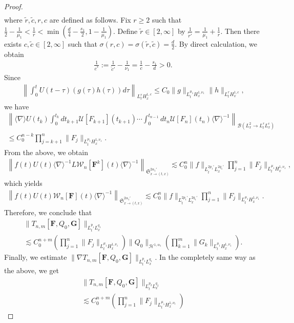 \documentclass[10pt]{amsart}
\newcommand{\No}[1]{}
\theoremstyle{definition}
\numberwithin{equation}{section}
\newcommand{\vF}{{\mathbf{F}}}
\newcommand{\vG}{{\mathbf{G}}}
\newcommand{\CB}{\mathcal{B}}
\newcommand{\CH}{\mathcal{H}}
\newcommand{\CU}{\mathcal{U}}
\newcommand{\CW}{\mathcal{W}}
\newcommand{\FS}{\mathfrak{S}}
\newcommand{\al}{\alpha}
\newcommand{\ta}{\tau}
\newcommand{\si}{\sigma}
\newcommand{\wt}{\widetilde}
\newcommand{\K}[1]{\left(#1\right)}
\renewcommand{\No}[1]{\left\| #1 \right\|}
\newcommand{\I}{\infty}
\newcommand{\sd}{\langle \nabla \rangle}
\newcommand{\sdi}{\sd^{-1}}
\newcommand{\tx}{{t,x}}
\newcommand{\tw}{\frac{1}{2}}
\newcommand{\na}{\nabla}
\newcommand{\ls}{\lesssim}
\begin{document}
\begin{proof}
\begin{multline}
\end{multline}
where $\wt{r},\wt{c},r,c$ are defined as follows. Fix $r \ge 2$ such that $\tw-\frac{1}{\mu_1} < \frac{1}{r} < \min(\frac{d}{4}-\frac{s_1}{2}, 1-\frac{1}{\mu_1})$. Define $\wt{r} \in [2,\I]$ by $\frac{1}{\wt{r}'}=\frac{1}{\mu_1}+\frac{1}{r}$. Then there exists $c,\wt{c} \in [2,\I]$ such that $\si(r,c) = \si(\wt{r},\wt{c}) = \frac{d}{2}$. By direct calculation, we obtain
\begin{align}
\frac{1}{c^*}:=\frac{1}{\wt{c}'}-\frac{1}{\nu_1} = \frac{1}{c}-\frac{s_1}{d} > 0.
\end{align}
Since
\begin{align}
\No{
\int_0^t U(t-\ta)(g(\ta)h(\ta)) d\ta }_{L^r_t H^{1,c}_x}
\le C_0 \|g\|_{L^{\mu_1}_t H^{1,\nu_1}_x} \|h\|_{L^r_t H^{1,c}_x},
\end{align}
we have
\begin{multline}
\No{
\sd U(t_k)
\int_0^{t_k}dt_{k+1} \CU[F_{k+1}](t_{k+1})
\cdots
\int_0^{t_{n-1}} dt_n \CU[F_n](t_n) \sdi }_{\CB\left(L^2_x \to L^r_t L^c_x\right)} \\
\le C_0^{n-k}
\prod_{j=k+1}^n \|F_j\|_{L^{\mu_1}_t H^{1,\nu_1}_x}.
\end{multline}
From the above, we obtain
\begin{align}
\left\|f(t) U(t) \sdi L \CW_n[\vF^k](t) \sd^{-1}\right\|_{\FS^{2\al_1'}_{x \to (\tx)}}
\ls C_0^n \|f\|_{L^{2p_1'}_t L^{2q_1'}_x}\prod_{j=1}^n \|F_j\|_{L^{\mu_1}_t H^{1,\nu_1}_x},
\end{align}
which yields
\begin{align}\label{half}
\left\|f(t)U(t)\CW_n[\vF](t) \sd^{-1} \right\|_{\FS^{2\al_1'}_{x \to (\tx)}}
\ls C_0^n \|f\|_{L^{2p_1'}_t L^{2q_1'}_x}\prod_{j=1}^n \|F_j\|_{L^{\mu_1}_t H^{1,\nu_1}_x}.
\end{align}
Therefore, we conclude that
\begin{multline}
\|T_{n,m}[\vF,Q_0,\vG]\|_{L^{p_1}_t L^{q_1}_x}
\\
\ls C_0^{n+m} \K{\prod_{j=1}^n
\|F_j\|_{L^{\mu_1}_t H^{1,\nu_1}_x}}
\|Q_0\|_{\CH^{1,\al_1}}
\K{\prod_{k=1}^m \|G_k\|_{L^{\mu_1}_t H^{1,\nu_1}_x}}.
\end{multline}
Finally, we estimate $\|\na T_{n,m}[\vF,Q_0,\vG]\|_{L^{p_1}_t L^{q_1}_x}$. In the completely same way as the above, we get
\begin{multline}\label{End H1}
\|T_{n,m} [\vF,Q_0,\vG]\|_{L^{p_2}_t L^{q_2}_x}\\
\ls C_0^{n+m}
\K{\prod_{j=1}^n \|F_j\|_{L^{\mu_1}_t H^{1,\nu_1}_x}}

\end{multline}
\end{proof}
\end{document}
